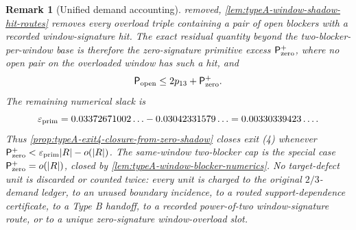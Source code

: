 \documentclass[11pt]{article}
\newtheorem{remark}[theorem]{Remark}
\begin{document}
\begin{remark}[Unified demand accounting]
removed, \cref{lem:typeA-window-shadow-hit-routes} removes every overload
triple containing a pair of open blockers with a recorded window-signature hit.
The exact residual quantity beyond the two-blocker-per-window base is therefore
the zero-signature primitive excess \(\mathsf P_{\rm zero}^{+}\), where no open
pair on the overloaded window has such a hit, and
\[
\mathsf P_{\rm open}\le2p_{13}+\mathsf P_{\rm zero}^{+}.
\]
The remaining numerical slack is
\[
\varepsilon_{\rm prim}
=
0.03372671002\ldots-0.03042331579\ldots
=0.00330339423\ldots .
\]
Thus \cref{prop:typeA-exit4-closure-from-zero-shadow} closes exit
\textup{(4)} whenever
\(\mathsf P_{\rm zero}^{+}<\varepsilon_{\rm prim}|R|-o(|R|)\).  The
same-window two-blocker cap is the special case
\(\mathsf P_{\rm zero}^{+}=o(|R|)\), closed by
\cref{lem:typeA-window-blocker-numerics}.  No target-defect unit is discarded
or counted twice: every unit is charged to the original \(2/3\)-demand
ledger, to an unused boundary incidence, to a routed support-dependence
certificate, to a Type B handoff, to a recorded power-of-two
window-signature route, or to a unique zero-signature window-overload slot.
\end{remark}
\end{document}
